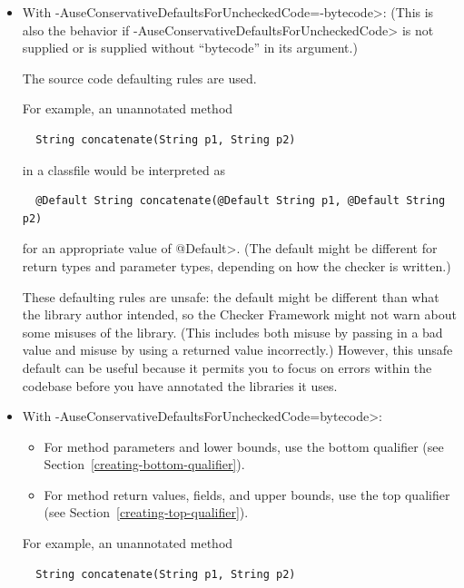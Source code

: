 \begin{itemize}
\item With \<-AuseConservativeDefaultsForUncheckedCode=-bytecode>:
(This is also the behavior if
\<-AuseConservativeDefaultsForUncheckedCode> is not supplied or is supplied
without ``bytecode'' in its argument.)

The source code defaulting rules are used.

For example, an unannotated method

\begin{Verbatim}
  String concatenate(String p1, String p2)
\end{Verbatim}

\noindent
in a classfile would be interpreted as

\begin{Verbatim}
  @Default String concatenate(@Default String p1, @Default String p2)
\end{Verbatim}

\noindent
for an appropriate value of \<@Default>.  (The default might be different for
return types and parameter types, depending on how the checker is written.)

These defaulting rules are unsafe:  the default might be different than
what the library author intended, so the Checker Framework might not warn
about some misuses of the library.  (This includes both misuse by passing
in a bad value and misuse by using a returned value incorrectly.)  However,
this unsafe default can be useful because it permits you to focus on errors
within the codebase before you have annotated the libraries it uses.


\item With \<-AuseConservativeDefaultsForUncheckedCode=bytecode>:

\begin{itemize}
\item
  For method parameters and lower bounds, use the bottom qualifier (see
  Section~\ref{creating-bottom-qualifier}).
\item
  For method return values, fields, and upper bounds, use the top qualifier (see
  Section~\ref{creating-top-qualifier}).
\end{itemize}

For example, an unannotated method

\begin{Verbatim}
  String concatenate(String p1, String p2)
\end{Verbatim}


\end{itemize}
